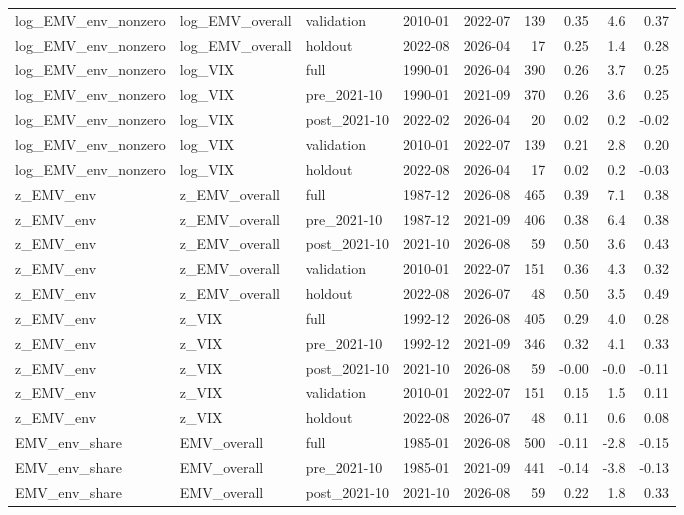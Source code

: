 \begin{table}
\begin{tabular}{lllllrrrr}
log\_EMV\_env\_nonzero & log\_EMV\_overall & validation & 2010-01 & 2022-07 & 139 & 0.35 & 4.6 & 0.37 \\
log\_EMV\_env\_nonzero & log\_EMV\_overall & holdout & 2022-08 & 2026-04 & 17 & 0.25 & 1.4 & 0.28 \\
log\_EMV\_env\_nonzero & log\_VIX & full & 1990-01 & 2026-04 & 390 & 0.26 & 3.7 & 0.25 \\
log\_EMV\_env\_nonzero & log\_VIX & pre\_2021-10 & 1990-01 & 2021-09 & 370 & 0.26 & 3.6 & 0.25 \\
log\_EMV\_env\_nonzero & log\_VIX & post\_2021-10 & 2022-02 & 2026-04 & 20 & 0.02 & 0.2 & -0.02 \\
log\_EMV\_env\_nonzero & log\_VIX & validation & 2010-01 & 2022-07 & 139 & 0.21 & 2.8 & 0.20 \\
log\_EMV\_env\_nonzero & log\_VIX & holdout & 2022-08 & 2026-04 & 17 & 0.02 & 0.2 & -0.03 \\
z\_EMV\_env & z\_EMV\_overall & full & 1987-12 & 2026-08 & 465 & 0.39 & 7.1 & 0.38 \\
z\_EMV\_env & z\_EMV\_overall & pre\_2021-10 & 1987-12 & 2021-09 & 406 & 0.38 & 6.4 & 0.38 \\
z\_EMV\_env & z\_EMV\_overall & post\_2021-10 & 2021-10 & 2026-08 & 59 & 0.50 & 3.6 & 0.43 \\
z\_EMV\_env & z\_EMV\_overall & validation & 2010-01 & 2022-07 & 151 & 0.36 & 4.3 & 0.32 \\
z\_EMV\_env & z\_EMV\_overall & holdout & 2022-08 & 2026-07 & 48 & 0.50 & 3.5 & 0.49 \\
z\_EMV\_env & z\_VIX & full & 1992-12 & 2026-08 & 405 & 0.29 & 4.0 & 0.28 \\
z\_EMV\_env & z\_VIX & pre\_2021-10 & 1992-12 & 2021-09 & 346 & 0.32 & 4.1 & 0.33 \\
z\_EMV\_env & z\_VIX & post\_2021-10 & 2021-10 & 2026-08 & 59 & -0.00 & -0.0 & -0.11 \\
z\_EMV\_env & z\_VIX & validation & 2010-01 & 2022-07 & 151 & 0.15 & 1.5 & 0.11 \\
z\_EMV\_env & z\_VIX & holdout & 2022-08 & 2026-07 & 48 & 0.11 & 0.6 & 0.08 \\
EMV\_env\_share & EMV\_overall & full & 1985-01 & 2026-08 & 500 & -0.11 & -2.8 & -0.15 \\
EMV\_env\_share & EMV\_overall & pre\_2021-10 & 1985-01 & 2021-09 & 441 & -0.14 & -3.8 & -0.13 \\
EMV\_env\_share & EMV\_overall & post\_2021-10 & 2021-10 & 2026-08 & 59 & 0.22 & 1.8 & 0.33 \\

\end{tabular}
\end{table}
